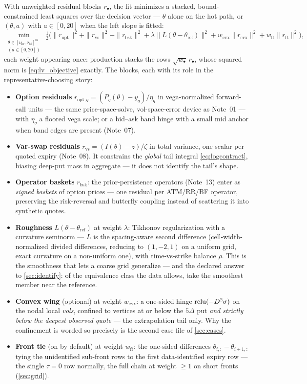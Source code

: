 \documentclass[11pt]{article}
\begin{document}
With unweighted residual blocks $r_{\bullet}$, the fit minimizes a stacked,
bound-constrained least squares over the decision vector --- $\theta$ alone
on the hot path, or $(\theta,a)$ with $a\in[0,20]$ when the left slope is
fitted:
\begin{equation}
\min_{\substack{\theta\in[\nu_{\mathrm{lo}},\nu_{\mathrm{hi}}]^{m}\\
(a\in[0,20])}}
\ \tfrac12\Big(
\|r_{\text{opt}}\|^{2}+\|r_{\text{vs}}\|^{2}+\|r_{\text{bsk}}\|^{2}
+\lambda\|L(\theta-\theta_{\text{ref}})\|^{2}
+w_{\text{cvx}}\|r_{\text{cvx}}\|^{2}
+w_{\text{ft}}\|r_{\text{ft}}\|^{2}\Big),
\label{eq:lv_objective}
\end{equation}
each weight appearing once: production stacks the rows
$\sqrt{w_{\bullet}}\,r_{\bullet}$, whose squared norm is
\eqref{eq:lv_objective} exactly.  The blocks, each with its role in the
representative-choosing story:
\begin{itemize}[leftmargin=1.4em]
\item \textbf{Option residuals}
$r_{\text{opt},q}=(P_q(\theta)-y_q)/\eta_q$ in vega-normalized
forward-call units --- the same price-space-solve, vol-space-error device
as Note~01 --- with $\eta_q$ a floored vega scale; or a bid--ask band hinge
with a small mid anchor when band edges are present (Note~07).
\item \textbf{Var-swap residuals} $r_{\text{vs}}=(I(\theta)-z)/\zeta$ in
total variance, one scalar per quoted expiry (Note~08).  It constrains the
\emph{global} tail integral \eqref{eq:logcontract}, biasing deep-put mass
in aggregate --- it does not identify the tail's shape.
\item \textbf{Operator baskets} $r_{\text{bsk}}$: the prior-persistence
operators (Note~13) enter as \emph{signed baskets} of option prices --- one
residual per ATM/RR/BF operator, preserving the risk-reversal and butterfly
coupling instead of scattering it into synthetic quotes.
\item \textbf{Roughness} $L(\theta-\theta_{\text{ref}})$ at weight
$\lambda$: Tikhonov regularization with a curvature seminorm --- $L$ is
the spacing-aware second difference (cell-width-normalized divided
differences, reducing to $(1,-2,1)$ on a uniform grid, exact curvature on
a non-uniform one), with time-vs-strike balance $\rho$.  This is the
smoothness that lets a coarse grid generalize --- and the declared answer
to \cref{sec:identify}: of the equivalence class the data allows, take the
smoothest member near the reference.
\item \textbf{Convex wing} (optional) at weight $w_{\text{cvx}}$: a
one-sided
hinge $\operatorname{relu}(-D^{2}\sigma)$ on the nodal local \emph{vols}, confined to
vertices at or below the $5\Delta$ put \emph{and strictly below the deepest
observed quote} --- the extrapolation tail only.  Why the confinement is
worded so precisely is the second case file of \cref{sec:cases}.
\item \textbf{Front tie} (on by default) at weight $w_{\text{ft}}$: the
one-sided differences $\theta_{i,:}-\theta_{i+1,:}$ tying the unidentified
sub-front rows to the first data-identified expiry row --- the single
$\tau=0$ row normally, the full chain at weight $\ge1$ on short fronts
(\cref{sec:grid}).
\end{itemize}
\end{document}
